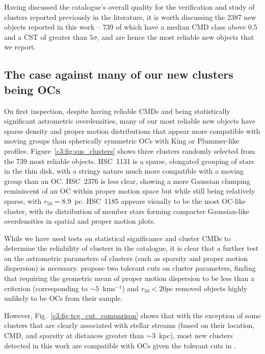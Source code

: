 Having discussed the catalogue's overall quality for the verification and study of clusters reported previously in the literature, it is worth discussing the 2387 new objects reported in this work -- 739 of which have a median CMD class above 0.5 and a CST of greater than $5\sigma$, and are hence the most reliable new objects that we report.

\subsection{The case against many of our new clusters being OCs}

On first inspection, despite having reliable CMDs and being statistically significant astrometric overdensities, many of our most reliable new objects have sparse density and proper motion distributions that appear more compatible with moving groups than spherically symmetric OCs with King \citep{king_structure_1962} or Plummer-like \citep{plummer_problem_1911} profiles. Figure~\ref{c3:fig:sus_clusters} shows three clusters randomly selected from the 739 most reliable objects. HSC~1131 is a sparse, elongated grouping of stars in the thin disk, with a stringy nature much more compatible with a moving group than an OC. HSC~2376 is less clear, showing a more Gaussian clumping reminiscent of an OC within proper motion space but while still being relatively sparse, with $r_{50} = 8.9$~pc. HSC~1185 appears visually to be the most OC-like cluster, with its distribution of member stars forming compacter Gaussian-like overdensities in spatial and proper motion plots.

While we have used tests on statistical significance and cluster CMDs to determine the reliability of clusters in the catalogue, it is clear that a further test on the astrometric parameters of clusters (such as sparsity and proper motion dispersion) is necessary. \cite{cantat-gaudin_clusters_2020} propose two tolerant cuts on cluster parameters, finding that requiring the geometric mean of proper motion dispersion to be less than a criterion (corresponding to $\sim 5$~kms$^{-1}$) and $r_{50} < 20pc$ removed objects highly unlikely to be OCs from their sample.

However, Fig.~\ref{c3:fig:tcg_cut_comparison} shows that with the exception of some clusters that are clearly associated with stellar streams (based on their location, CMD, and sparsity at distances greater than $\sim 3$~kpc), most new clusters detected in this work are compatible with OCs given the tolerant cuts in \cite{cantat-gaudin_clusters_2020}.

